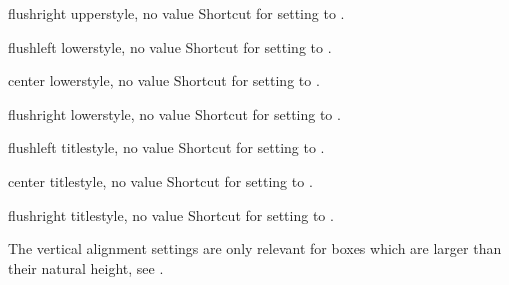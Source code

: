 \begin{docTcbKey}[][doc updated=2015-05-07]{flushright upper}{}{style, no value}
  Shortcut for setting  to .
\end{docTcbKey}

\begin{docTcbKey}[][doc updated=2015-05-07]{flushleft lower}{}{style, no value}
  Shortcut for setting  to .
\end{docTcbKey}

\begin{docTcbKey}[][doc updated=2015-05-07]{center lower}{}{style, no value}
  Shortcut for setting  to .
\end{docTcbKey}

\begin{docTcbKey}[][doc updated=2015-05-07]{flushright lower}{}{style, no value}
  Shortcut for setting  to .
\end{docTcbKey}


\begin{docTcbKey}[][doc updated=2015-05-07]{flushleft title}{}{style, no value}
  Shortcut for setting  to .
\end{docTcbKey}

\begin{docTcbKey}[][doc updated=2015-05-07]{center title}{}{style, no value}
  Shortcut for setting  to .
\end{docTcbKey}

\begin{docTcbKey}[][doc updated=2015-05-07]{flushright title}{}{style, no value}
  Shortcut for setting  to .
\end{docTcbKey}

\clearpage

\begin{marker}
The vertical alignment settings are only relevant for boxes which are larger
than their natural height, see .
\end{marker}

